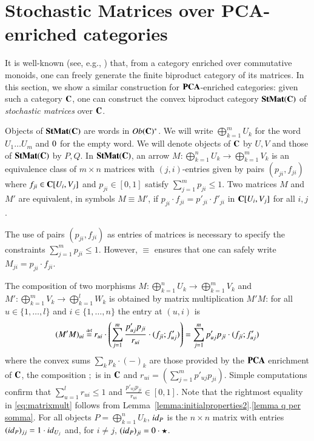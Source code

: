 %
%
\section{Stochastic Matrices over PCA-enriched categories}\label{sec:cmatrix}    
It is well-known (see, e.g., \cite[Exercises VIII.2.5-6]{mac_lane_categories_1978}) that, from a category enriched over commutative monoids, one can freely generate the finite biproduct category of its matrices. In this section, we show a similar construction for $\mathbf{PCA}$-enriched categories: given such a category $\mathbf{C}$, one can construct the convex biproduct category $\mathbf{StMat}(\mathbf{C})$ of \emph{stochastic matrices} over $\mathbf{C}$.

Objects of $\mathbf{StMat}(\mathbf{C})$ are words in $Ob(\mathbf{C})^*$. We will write $\bigoplus_{k=1}^m U_k$ for the word $U_1\dots U_m$ and $0$ for the empty word. We will denote objects of $\mathbf{C}$ by $U,V$ and those of $\mathbf{StMat}(\mathbf{C})$ by $P,Q$. In $\mathbf{StMat}(\mathbf{C})$, an arrow $M\colon\bigoplus_{k=1}^n U_k\to \bigoplus_{k=1}^m V_k$ is an equivalence class of  $m\times n$ matrices with $(j,i)$-entries given by pairs $ (p_{ji}, f_{ji})$ where $f_{ji}\in\mathbf{C}[U_i,V_j]$ and $p_{ji}\in[0,1]$ satisfy $\sum_{j=1}^{m}p_{ji}\le 1$. Two matrices $M$ and $M'$ are equivalent, in symbols $M\equiv M'$, if $p_{ji}\cdot f_{ji}= p'_{ji}\cdot f'_{ji}$ in $\mathbf{C}[U_i,V_j]$ for all $i,j$. 
\begin{remark}
The use of pairs $ (p_{ji}, f_{ji})$ as entries of matrices is necessary to specify the constraints $\sum_{j=1}^{m}p_{ji}\le 1$. However, $\equiv$ ensures that one can safely write $M_{ji}= p_{ji}\cdot f_{ji}$.
\end{remark}

The composition of two morphisms $M\colon\bigoplus_{k=1}^n U_k\to \bigoplus_{k=1}^m V_k$ and $M'\colon\bigoplus_{k=1}^m V_k\to \bigoplus_{k=1}^l W_k$ %
is obtained by matrix multiplication $M'M$: for all $u\in \{1,\dots,l\}$ and $i\in \{1,\dots,n\}$ the entry at $(u,i)$ is 
\begin{equation}\label{eq:matrixmult}(M'M)_{ui} \stackrel{\text{\tiny def}}{=}  r_{ui}\cdot \left(\sum_{j=1}^{m} \frac{p'_{uj}p_{ji}}{r_{ui}}\cdot (f_{ji};f'_{uj})\right) = \sum_{j=1}^{m} p'_{uj}p_{ji}\cdot (f_{ji};f'_{uj})\end{equation} 
where the convex sums $\sum_k p_k\cdot (-)_k$ are those provided by the $\mathbf{PCA}$ enrichment of $\mathbf{C}$, the composition $;$ is in $\mathbf{C}$ and
$r_{ui}= (\sum_{j=1}^{m} p'_{uj}p_{ji})$. Simple computations confirm that $\sum_{u=1}^{l}r_{ui}\leq 1$ and $\frac{p'_{uj}p_{ji}}{r_{ui}}\in[0,1]$. Note that the rightmost equality in \eqref{eq:matrixmult} follows from Lemma~\ref{lemma:initialproperties2}.\ref{lemma q per somma}.
For all objects $P=\bigoplus_{k=1}^n U_k$, ${id}_{P}$ is the $n\times n$ matrix with entries $({id}_{P})_{jj}=1\cdot {id}_{U_j}$ and, for $i\neq j$, $({id}_{P})_{ji}=0 \cdot \star$.


